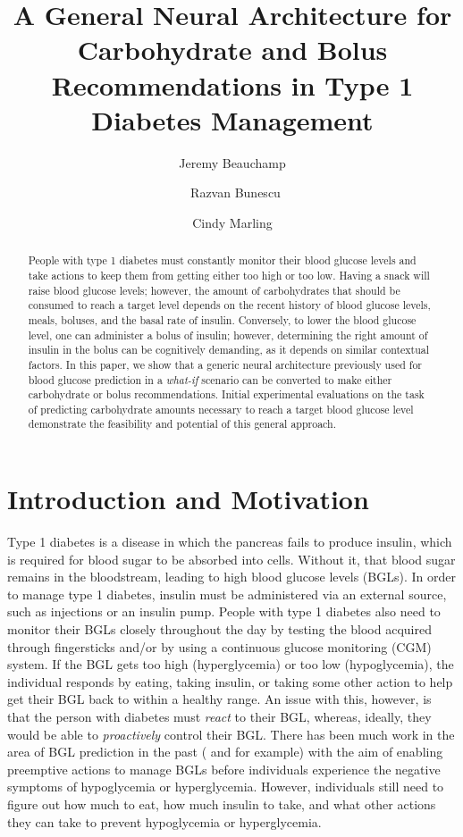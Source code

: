 \documentclass{ecai}
\begin{document}
\title{A General Neural Architecture for Carbohydrate and Bolus Recommendations in Type 1 Diabetes Management}

\author{Jeremy Beauchamp \and \ Razvan Bunescu \and Cindy Marling}

\maketitle


\begin{abstract}
People with type 1 diabetes must constantly monitor their blood glucose levels and take actions to keep them from getting either too high or too low. Having a snack will raise blood glucose levels; however, the amount of carbohydrates that should be consumed to reach a target level depends on the recent history of blood glucose levels, meals, boluses, and the basal rate of insulin. Conversely, to lower the blood glucose level, one can administer a bolus of insulin; however, determining the right amount of insulin in the bolus can be cognitively demanding, as it depends on similar contextual factors. In this paper, we show that a generic neural architecture previously used for blood glucose prediction in a {\it what-if} scenario can be converted to make either carbohydrate or bolus recommendations. Initial experimental evaluations on the task of predicting carbohydrate amounts necessary to reach a target blood glucose level demonstrate the feasibility and potential of this general approach.
\end{abstract}

\section{Introduction and Motivation}

Type 1 diabetes is a disease in which the pancreas fails to produce insulin, which is required for blood sugar to be absorbed into cells. Without it, that blood sugar remains in the bloodstream, leading to high blood glucose levels (BGLs). In order to manage type 1 diabetes, insulin must be administered via an external source, such as injections or an insulin pump. People with type 1 diabetes also need to monitor their BGLs closely throughout the day by testing the blood acquired through fingersticks and/or by using a continuous glucose monitoring (CGM) system. If the BGL gets too high (hyperglycemia) or too low (hypoglycemia), the individual responds by eating, taking insulin, or taking some other action to help get their BGL back to within a healthy range. An issue with this, however, is that the person with diabetes must \emph{react} to their BGL, whereas, ideally, they would be able to \emph{proactively} control their BGL. There has been much work in the area of BGL prediction in the past (\cite{bunescu:icmla13} and \cite{plis:maiha14} for example) with the aim of enabling preemptive actions to manage BGLs before individuals experience the negative symptoms of hypoglycemia or hyperglycemia. However, individuals still need to figure out how much to eat, how much insulin to take, and what other actions they can take to prevent hypoglycemia or hyperglycemia.
\end{document}

